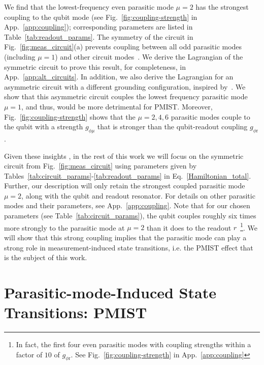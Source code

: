\documentclass[%
reprint,
superscriptaddress,
 amsmath,amssymb,
 aps,
 prx,
longbibliography,
floatfix,
]{revtex4-2}
\begin{document}
 
 We find that the lowest-frequency even parasitic mode $\mu=2$ has the strongest coupling to the qubit mode (see Fig.~\ref{fig:coupling-strength} in App.~\ref{app:coupling}); corresponding parameters are listed in Table~\ref{tab:readout_params}. The symmetry of the circuit in Fig.~\ref{fig:meas_circuit}(a) prevents coupling between all odd parasitic modes (including $\mu=1$) and other circuit modes~\cite{viola2015collective}. We derive the Lagrangian of the symmetric circuit to prove this result, for completeness, in App.~\ref{app:alt_circuits}. In addition, we also derive the Lagrangian for an asymmetric circuit with a different grounding configuration, inspired by~\cite{zhang_universal_2021}. We show that this asymmetric circuit couples the lowest frequency parasitic mode $\mu=1$, and thus, would be more detrimental for PMIST. Moreover, Fig.~\ref{fig:coupling-strength} shows that the $\mu=2,4,6$ parasitic modes couple to the qubit with a strength $g_{\phi\mu}$ that is stronger than the qubit-readout coupling $g_{\phi \textrm{r}}$.
 
 Given these insights%
 , in the rest of this work we will focus on the symmetric circuit from Fig.~\ref{fig:meas_circuit} using parameters given by Tables~\ref{tab:circuit_params}-\ref{tab:readout_params} in Eq.~\ref{Hamiltonian_total}.  Further, our description will only retain the strongest coupled parasitic mode $\mu = 2$, along with the qubit and readout resonator.  For details on other parasitic modes and their parameters, see App.~\ref{app:coupling}. Note that for our chosen parameters (see Table~\ref{tab:circuit_params}), the qubit couples roughly six times more strongly to the parasitic mode at $\mu=2$ than it does to the readout $r$~\footnote{In fact, the first four even parasitic modes with coupling strengths within a factor of $10$ of $g_{\phi \textrm{r}}$. See Fig.~\ref{fig:coupling-strength} in App.~\ref{app:coupling}}.  We will show that this strong coupling implies that the parasitic mode can play a strong role in measurement-induced state transitions, i.e. the PMIST effect that is the subject of this work.   

\section{Parasitic-mode-Induced State Transitions: PMIST}\label{sec:MIST}
\end{document}

